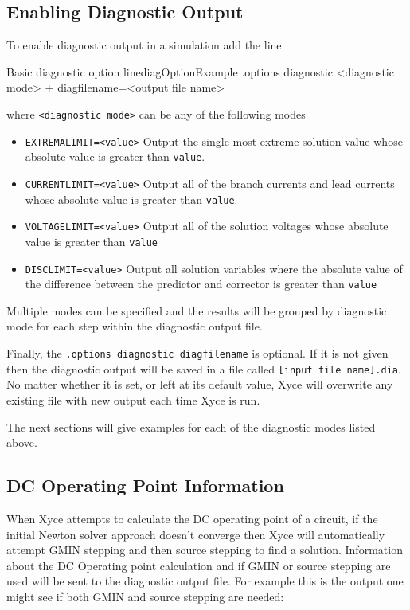 \subsection{Enabling Diagnostic Output}
To enable diagnostic output in a simulation add the line
\begin{NetlistFigure}{Basic diagnostic option line}{diagOptionExample}
.options diagnostic <diagnostic mode> 
+ diagfilename=<output file name>
\end{NetlistFigure}
where \texttt{<diagnostic mode>} can be any of the following modes
\begin{itemize}
  \item \texttt{EXTREMALIMIT=<value>}  Output the single most extreme solution value 
    whose absolute value is greater than \texttt{value}.
  \item \texttt{CURRENTLIMIT=<value>}  Output all of the branch currents and lead currents  
    whose absolute value is greater than \texttt{value}.
  \item \texttt{VOLTAGELIMIT=<value>}  Output all of the solution voltages  
    whose absolute value is greater than \texttt{value}
  \item \texttt{DISCLIMIT=<value>}  Output all solution variables where the absolute value
    of the difference between the predictor and corrector is greater than \texttt{value}
\end{itemize}
Multiple modes can be specified and the results will be grouped by diagnostic mode for 
each step within the diagnostic output file.

Finally, the \texttt{.options diagnostic diagfilename} is optional.  If it is not given then 
the diagnostic output will be saved in a file called \texttt{[input file name].dia}.  
No matter whether it is set, or left at its default value, Xyce will overwrite any existing 
file with new output each time Xyce is run.  

The next sections will give examples for each of the diagnostic modes listed above.

\subsection{DC Operating Point Information}
When Xyce attempts to calculate the DC operating point of a circuit, if the initial 
Newton solver approach doesn't converge then Xyce will automatically attempt GMIN
stepping and then source stepping to find a solution.  Information about the DC
Operating point calculation and if GMIN or source stepping are used will be sent 
to the diagnostic output file.  For example this is the output one might see
if both GMIN and source stepping are needed:

